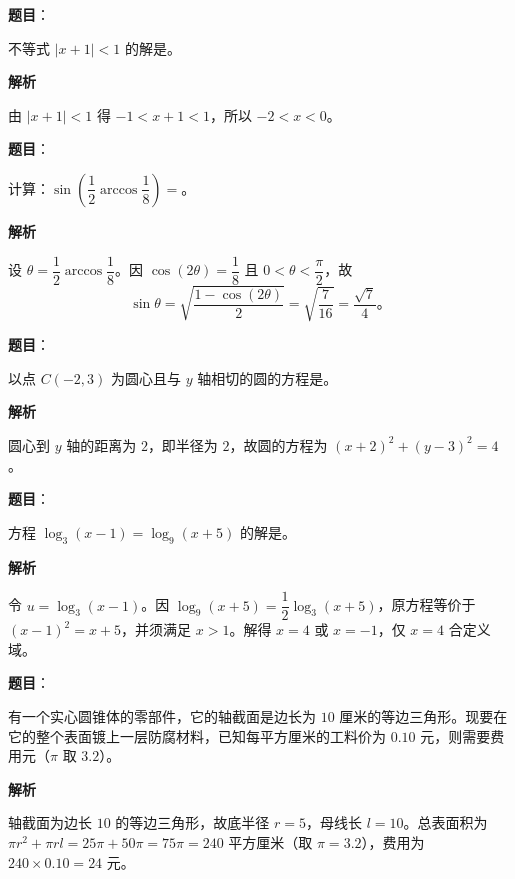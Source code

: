 \begin{answer}

\textbf{题目}：

不等式 $|x+1|<1$ 的解是\gkblank{}。

\textbf{解析}

由 $|x+1|<1$ 得 $-1<x+1<1$，所以 $-2<x<0$。


\end{answer}
\begin{answer}

\textbf{题目}：

计算：$\sin\left(\dfrac12\arccos\dfrac18\right)=$\gkblank{}。

\textbf{解析}

设 $\theta=\dfrac12\arccos\dfrac18$。因 $\cos(2\theta)=\dfrac18$ 且 $0<\theta<\dfrac\pi2$，故
\nopagebreak[4]
\[
\sin\theta=\sqrt{\frac{1-\cos(2\theta)}2}=\sqrt{\frac7{16}}=\frac{\sqrt7}{4}\mbox{。}
\]


\end{answer}
\begin{answer}

\textbf{题目}：

以点 $C(-2,3)$ 为圆心且与 $y$ 轴相切的圆的方程是\gkblank{}。

\textbf{解析}

圆心到 $y$ 轴的距离为 $2$，即半径为 $2$，故圆的方程为 $(x+2)^2+(y-3)^2=4$。


\end{answer}
\begin{answer}

\textbf{题目}：

方程 $\log_3(x-1)=\log_9(x+5)$ 的解是\gkblank{}。

\textbf{解析}

令 $u=\log_3(x-1)$。因 $\log_9(x+5)=\dfrac12\log_3(x+5)$，原方程等价于 $(x-1)^2=x+5$，并须满足 $x>1$。解得 $x=4$ 或 $x=-1$，仅 $x=4$ 合定义域。


\end{answer}
\begin{answer}

\textbf{题目}：

有一个实心圆锥体的零部件，它的轴截面是边长为 $10$ 厘米的等边三角形。现要在它的整个表面镀上一层防腐材料，已知每平方厘米的工料价为 $0.10$ 元，则需要费用\gkblank{}元（$\pi$ 取 $3.2$）。

\textbf{解析}

轴截面为边长 $10$ 的等边三角形，故底半径 $r=5$，母线长 $l=10$。总表面积为 $\pi r^2+\pi rl=25\pi+50\pi=75\pi=240$ 平方厘米（取 $\pi=3.2$），费用为 $240\times0.10=24$ 元。


\end{answer}
